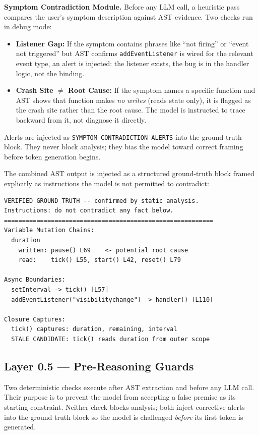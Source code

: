 \documentclass[12pt,a4paper]{article}
\newcommand{\code}[1]{\texttt{\small #1}}
\begin{document}
\textbf{Symptom Contradiction Module.}\label{sec:symptom-contradiction} Before any LLM call, a heuristic pass compares the
user's symptom description against AST evidence. Two checks run in debug mode:
\begin{itemize}
  \item \textbf{Listener Gap:} If the symptom contains phrases like ``not firing'' or
        ``event not triggered'' but AST confirms \code{addEventListener} is wired for the
        relevant event type, an alert is injected: the listener exists, the bug is in the
        handler logic, not the binding.
  \item \textbf{Crash Site $\neq$ Root Cause:} If the symptom names a specific function
        and AST shows that function makes \textit{no writes} (reads state only), it is
        flagged as the crash site rather than the root cause. The model is instructed to
        trace backward from it, not diagnose it directly.
\end{itemize}
Alerts are injected as \texttt{SYMPTOM CONTRADICTION ALERTS} into the ground truth block.
They never block analysis; they bias the model toward correct framing before token
generation begins.

The combined AST output is injected as a structured ground-truth block framed explicitly
as instructions the model is not permitted to contradict:

\begin{lstlisting}[language={},style=code]
VERIFIED GROUND TRUTH -- confirmed by static analysis.
Instructions: do not contradict any fact below.
==========================================================
Variable Mutation Chains:
  duration
    written: pause() L69    <- potential root cause
    read:    tick() L55, start() L42, reset() L79

Async Boundaries:
  setInterval -> tick() [L57]
  addEventListener("visibilitychange") -> handler() [L110]

Closure Captures:
  tick() captures: duration, remaining, interval
  STALE CANDIDATE: tick() reads duration from outer scope
\end{lstlisting}

\subsection{Layer 0.5 — Pre-Reasoning Guards}

\begin{defbox}[title={Layer 0.5: Pre-Reasoning Guards}]
\small
Two deterministic checks execute after AST extraction and before any LLM call.
Their purpose is to prevent the model from accepting a false premise as its
starting constraint. Neither check blocks analysis; both inject corrective alerts
into the ground truth block so the model is challenged \emph{before} its first
token is generated.
\end{defbox}
\end{document}
